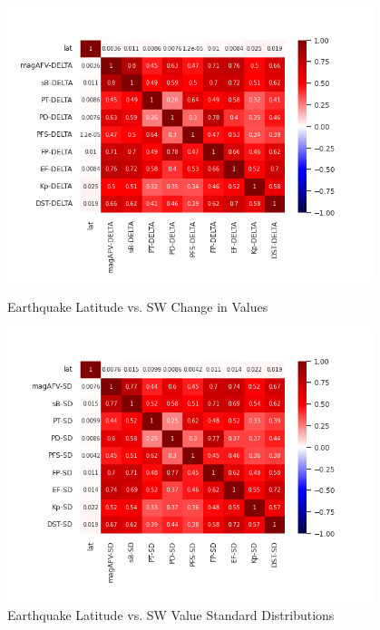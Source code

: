 \documentclass[12pt]{article}
\begin{document}
\begin{figure}
\centering
  \includegraphics[width=0.95\textwidth]{corr-lat-DELTA.png}
  \caption{Earthquake Latitude vs. SW Change in Values}

  \includegraphics[width=0.95\textwidth]{corr-lat-SD.png}
  \caption{Earthquake Latitude vs. SW Value Standard Distributions}

\end{figure}

\newpage
\end{document}
